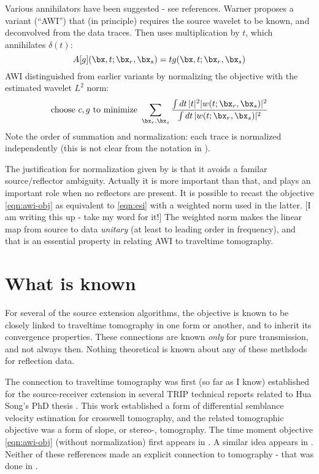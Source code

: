 Various annihilators have been suggested - see references. Warner proposes a variant (``AWI'')  that (in principle) requires the source wavelet to be known, and deconvolved from the data traces. Then uses multiplication by $t$, which annihilates $\delta(t)$:
\begin{equation}
\label{eqn:awi-ann}
A[g](\bx,t;\bx_r,\bx_s) = t g (\bx,t;\bx_r,\bx_s)
\end{equation}
AWI distinguished from earlier variants by normalizing the objective with the estimated wavelet $L^2$ norm:
\begin{equation}
\label{eqn:awi-obj}
\mbox{choose } c, g \mbox{ to minimize } \sum_{\bx_r,\bx_s}\frac{\int dt\,|t|^2 |w(t;\bx_r,\bx_s)|^2}{\int dt\,|w(t;\bx_r,\bx_s)|^2}
\end{equation}
Note the order of summation and normalization: each trace is normalized independently (this is not clear from the notation in \cite[]{Warner:16}).

The justification for normalization given by \cite{Warner:16} is that it avoids a familar source/reflector ambiguity. Actually it is more important than that, and plays an important role when no reflectors are present. It is possible to recast the objective \ref{eqn:awi-obj} as equivalent to \ref{eqn:esi} with a weighted norm used in the latter. [I am writing this up - take my word for it!] The weighted norm makes the linear map from source to data {\em unitary} (at least to leading order in frequency), and that is an essential property in relating AWI to traveltime tomography.

\section{What is known}
For several of the source extension algorithms, the objective is known to be closely linked to traveltime tomography in one form or another, and to inherit its convergence properties. These connections are known {\em only} for pure transmission, and not always then. Nothing theoretical is known about any of these methdods for reflection data.

The connection to traveltime tomography was first (so far as I know) established for the source-receiver extension in several TRIP technical reports related to Hua Song's PhD thesis \cite[]{Song:94c,SoSy:92,SongSymes:94a,SongSymes:94b,Symes:94c}. This work established a form of differential semblance velocity estimation for crosswell tomography, and the related tomographic objective was a form of slope, or stereo-, tomography. The time moment objective \ref{eqn:awi-obj} (without normalization) first appears in \cite[]{Plessix:00a,Plessix:00}. A similar idea appears in \cite[]{LuoSava:11}. Neither of these refferences made an explicit connection to tomography - that was done in \cite[]{HuangSymes2015SEG,HuangSymes:17}.

